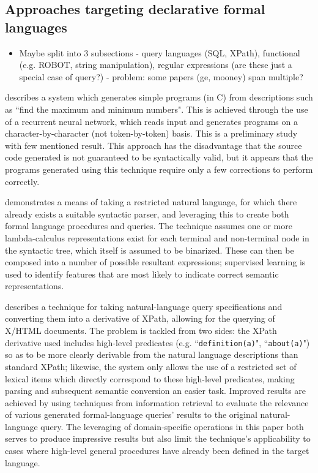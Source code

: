 \documentclass[a4paper,11pt]{proposal}
\begin{document}
\subsection{Approaches targeting declarative formal languages}
\begin{itemize}
\item Maybe split into 3 subsections - query languages (SQL, XPath), functional (e.g. ROBOT, string manipulation), regular expressions (are these just a special case of query?) - problem: some papers (ge, mooney) span multiple?
\end{itemize}

\cite{mou2015} describes a system which generates simple programs (in C) from descriptions such as ``find the maximum and minimum numbers". This is achieved through the use of a recurrent neural network, which reads input and generates programs on a character-by-character (not token-by-token) basis. This is a preliminary study with few mentioned result. This approach has the disadvantage that the source code generated is not guaranteed to be syntactically valid, but it appears that the programs generated using this technique require only a few corrections to perform correctly.

\cite{ge2009} demonstrates a means of taking a restricted natural language, for which there already exists a suitable syntactic parser, and leveraging this to create both formal language procedures and queries. The technique assumes one or more lambda-calculus representations exist for each terminal and non-terminal node in the syntactic tree, which itself is assumed to be binarized. These can then be composed into a number of possible resultant expressions; supervised learning is used to identify features that are most likely to indicate correct semantic representations.

\cite{tannier2005} describes a technique for taking natural-language query specifications and converting them into a derivative of XPath, allowing for the querying of X/HTML documents. The problem is tackled from two sides: the XPath derivative used includes high-level predicates (e.g. ``\texttt{definition(a)}", ``\texttt{about(a)}") so as to be more clearly derivable from the natural language descriptions than standard XPath; likewise, the system only allows the use of a restricted set of lexical items which directly correspond to these high-level predicates, making parsing and subsequent semantic conversion an easier task. Improved results are achieved by using techniques from information retrieval to evaluate the relevance of various generated formal-language queries' results to the original natural-language query. The leveraging of domain-specific operations in this paper both serves to produce impressive results but also limit the technique's applicability to cases where high-level general procedures have already been defined in the target language.
\end{document}
